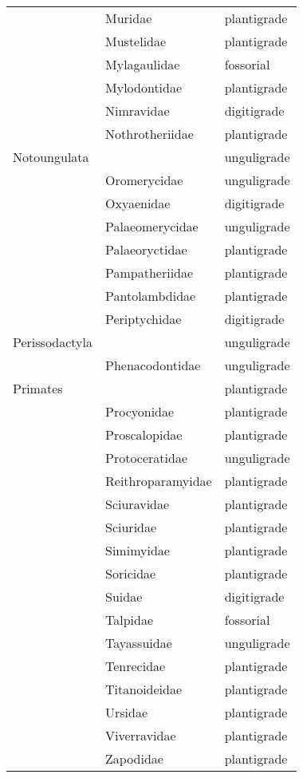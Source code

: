 \begin{center}
\begin{longtable}{ l l l }
    & Muridae & plantigrade \\ 
    & Mustelidae & plantigrade \\ 
    & Mylagaulidae & fossorial \\ 
    & Mylodontidae & plantigrade \\ 
    & Nimravidae & digitigrade \\ 
    & Nothrotheriidae & plantigrade \\ 
    Notoungulata &  & unguligrade \\ 
    & Oromerycidae & unguligrade \\ 
    & Oxyaenidae & digitigrade \\ 
    & Palaeomerycidae & unguligrade \\ 
    & Palaeoryctidae & plantigrade \\ 
    & Pampatheriidae & plantigrade \\ 
    & Pantolambdidae & plantigrade \\ 
    & Periptychidae & digitigrade \\ 
    Perissodactyla &  & unguligrade \\ 
    & Phenacodontidae & unguligrade \\ 
    Primates &  & plantigrade \\ 
    & Procyonidae & plantigrade \\ 
    & Proscalopidae & plantigrade \\ 
    & Protoceratidae & unguligrade \\ 
    & Reithroparamyidae & plantigrade \\ 
    & Sciuravidae & plantigrade \\ 
    & Sciuridae & plantigrade \\ 
    & Simimyidae & plantigrade \\ 
    & Soricidae & plantigrade \\ 
    & Suidae & digitigrade \\ 
    & Talpidae & fossorial \\ 
    & Tayassuidae & unguligrade \\ 
    & Tenrecidae & plantigrade \\ 
    & Titanoideidae & plantigrade \\ 
    & Ursidae & plantigrade \\ 
    & Viverravidae & plantigrade \\ 
    & Zapodidae & plantigrade \\ 
    \hline
  \end{longtable}
\end{center}
